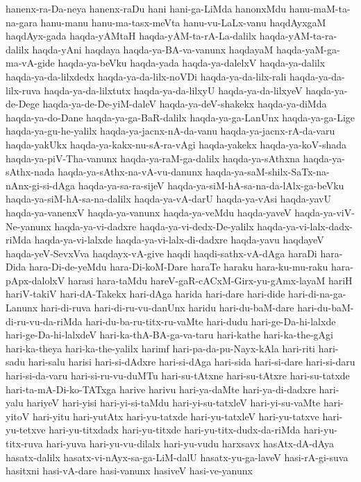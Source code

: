 {hanenx-ra-Da-neya
hanenx-raDu
hani
hani-ga-LiMda
hanonxMdu
hanu-maM-ta-na-gara
hanu-manu
hanu-ma-tasx-meVta
hanu-vu-LaLx-vanu
haqdAyxgaM
haqdAyx-gada
haqda-yAMtaH
haqda-yAM-ta-rA-La-dalilx
haqda-yAM-ta-ra-dalilx
haqda-yAni
haqdaya
haqda-ya-BA-va-vanunx
haqdayaM
haqda-yaM-ga-ma-vA-gide
haqda-ya-beVku
haqda-yada
haqda-ya-dalelxV
haqda-ya-dalilx
haqda-ya-da-lilxdedx
haqda-ya-da-lilx-noVDi
haqda-ya-da-lilx-rali
haqda-ya-da-lilx-ruva
haqda-ya-da-lilxtutx
haqda-ya-da-lilxyU
haqda-ya-da-lilxyeV
haqda-ya-de-Dege
haqda-ya-de-De-yiM-daleV
haqda-ya-deV-shakekx
haqda-ya-diMda
haqda-ya-do-Dane
haqda-ya-ga-BaR-dalilx
haqda-ya-ga-LanUnx
haqda-ya-ga-Lige
haqda-ya-gu-he-yalilx
haqda-ya-jacnx-nA-da-vanu
haqda-ya-jacnx-rA-da-varu
haqda-yakUkx
haqda-ya-kakx-nu-sA-ra-vAgi
haqda-yakekx
haqda-ya-koV-shada
haqda-ya-piV-Tha-vanunx
haqda-ya-raM-ga-dalilx
haqda-ya-sAthxna
haqda-ya-sAthx-nada
haqda-ya-sAthx-na-vA-vu-danunx
haqda-ya-saM-shilx-SaTx-na-nAnx-gi-si-dAga
haqda-ya-sa-ra-sijeV
haqda-ya-siM-hA-sa-na-da-lAlx-ga-beVku
haqda-ya-siM-hA-sa-na-dalilx
haqda-ya-vA-darU
haqda-ya-vAsi
haqda-yavU
haqda-ya-vanenxV
haqda-ya-vanunx
haqda-ya-veMdu
haqda-yaveV
haqda-ya-viV-Ne-yanunx
haqda-ya-vi-dadxre
haqda-ya-vi-dedx-De-yalilx
haqda-ya-vi-lalx-dadx-riMda
haqda-ya-vi-lalxde
haqda-ya-vi-lalx-di-dadxre
haqda-yavu
haqdayeV
haqda-yeV-SevxVva
haqdayx-vA-give
haqdi
haqdi-sathx-vA-dAga
haraDi
hara-Dida
hara-Di-de-yeMdu
hara-Di-koM-Dare
haraTe
haraku
hara-ku-mu-raku
hara-pApx-dalolxV
harasi
hara-taMdu
hareV-gaR-cACxM-Girx-yu-gAmx-layaM
hariH
hariV-takiV
hari-dA-Takekx
hari-dAga
harida
hari-dare
hari-dide
hari-di-na-ga-Lanunx
hari-di-ruva
hari-di-ru-vu-danUnx
haridu
hari-du-baM-dare
hari-du-baM-di-ru-vu-da-riMda
hari-du-ba-ru-titx-ru-vaMte
hari-dudu
hari-ge-Da-hi-lalxde
hari-ge-Da-hi-lalxdeV
hari-ka-thA-BA-ga-va-taru
hari-kathe
hari-ka-the-gAgi
hari-ka-theya
hari-ka-the-yalilx
harimf
hari-pa-da-pu-Nayx-kAla
hari-riti
hari-sadu
hari-salu
harisi
hari-si-dAdxre
hari-si-dAga
hari-sida
hari-si-dare
hari-si-daru
hari-si-da-varu
hari-si-ru-vu-duMTu
hari-su-tAtxne
hari-su-tAtxre
hari-su-tatxde
hari-ta-mA-Di-ko-TATxga
harive
harivu
hari-ya-daMte
hari-ya-di-dadxre
hari-yalu
hariyeV
hari-yisi
hari-yi-si-taMdu
hari-yi-su-tatxleV
hari-yi-su-vaMte
hari-yitoV
hari-yitu
hari-yutAtx
hari-yu-tatxde
hari-yu-tatxleV
hari-yu-tatxve
hari-yu-tetxve
hari-yu-titxdadx
hari-yu-titxde
hari-yu-titx-dudx-da-riMda
hari-yu-titx-ruva
hari-yuva
hari-yu-vu-dilalx
hari-yu-vudu
harxsavx
hasAtx-dA-dAya
hasatx-dalilx
hasatx-vi-nAyx-sa-ga-LiM-dalU
hasatx-yu-ga-laveV
hasi-rA-gi-suva
hasitxni
hasi-vA-dare
hasi-vanunx
hasiveV
hasi-ve-yanunx
}
